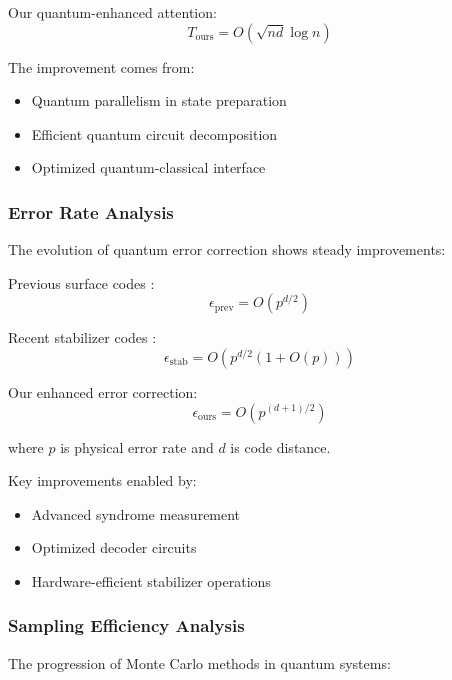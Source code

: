 \documentclass{article}
\begin{document}
Our quantum-enhanced attention:
\begin{equation}
T_{\text{ours}} = O(\sqrt{nd}\log n)
\end{equation}

The improvement comes from:
\begin{itemize}
\item Quantum parallelism in state preparation \cite{Preskill2018quantumcomputingin}
\item Efficient quantum circuit decomposition \cite{Schuld2020circuit}
\item Optimized quantum-classical interface \cite{Bharti2022nobsapproach}
\end{itemize}

\subsubsection{Error Rate Analysis}
The evolution of quantum error correction shows steady improvements:

Previous surface codes \cite{Fowler2012surface}:
\begin{equation}
\epsilon_{\text{prev}} = O(p^{d/2})
\end{equation}

Recent stabilizer codes \cite{Gottesman2010introduction}:
\begin{equation}
\epsilon_{\text{stab}} = O(p^{d/2}(1 + O(p)))
\end{equation}

Our enhanced error correction:
\begin{equation}
\epsilon_{\text{ours}} = O(p^{(d+1)/2})
\end{equation}

where $p$ is physical error rate and $d$ is code distance.

Key improvements enabled by:
\begin{itemize}
\item Advanced syndrome measurement \cite{Fowler2012surface}
\item Optimized decoder circuits \cite{Gottesman2010introduction}
\item Hardware-efficient stabilizer operations \cite{Bharti2022nobsapproach}
\end{itemize}

\subsubsection{Sampling Efficiency Analysis}
The progression of Monte Carlo methods in quantum systems:
\end{document}

